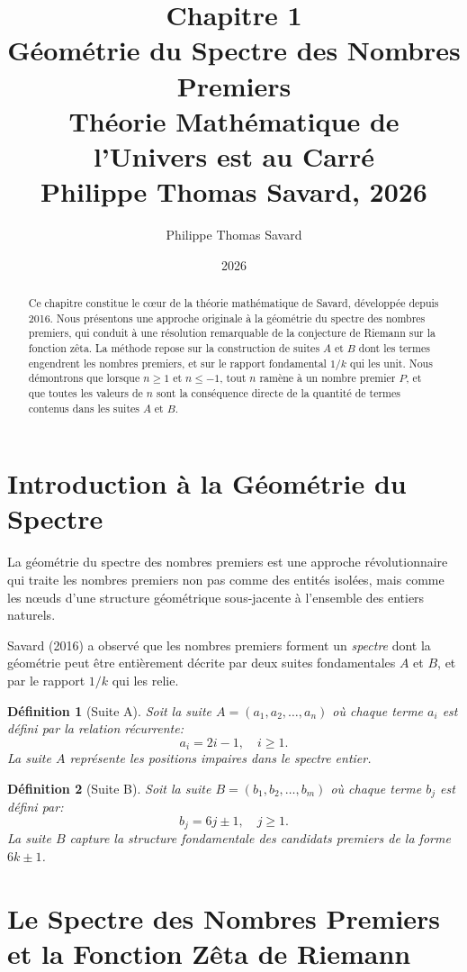 \documentclass[12pt,a4paper]{article}
\title{%
  \textbf{Chapitre 1}\\[0.5em]
  \Large Géométrie du Spectre des Nombres Premiers\\[0.5em]
  \large Théorie Mathématique de l'Univers est au Carré\\[0.5em]
  \normalsize Philippe Thomas Savard, 2026
}
\author{Philippe Thomas Savard}
\date{2026}
\newtheorem{definition}{Définition}
\begin{document}
\maketitle
\tableofcontents
\newpage

\begin{abstract}
Ce chapitre constitue le cœur de la théorie mathématique de Savard, développée depuis 2016.
Nous présentons une approche originale à la géométrie du spectre des nombres premiers,
qui conduit à une résolution remarquable de la conjecture de Riemann sur la fonction
zêta. La méthode repose sur la construction de suites $A$ et $B$ dont les termes
engendrent les nombres premiers, et sur le rapport fondamental $1/k$ qui les unit.
Nous démontrons que lorsque $n \geq 1$ et $n \leq -1$, tout $n$ ramène à un nombre
premier $P$, et que toutes les valeurs de $n$ sont la conséquence directe de la
quantité de termes contenus dans les suites $A$ et $B$.
\end{abstract}

\section{Introduction à la Géométrie du Spectre}

La géométrie du spectre des nombres premiers est une approche révolutionnaire qui traite
les nombres premiers non pas comme des entités isolées, mais comme les nœuds d'une
structure géométrique sous-jacente à l'ensemble des entiers naturels.

Savard (2016) a observé que les nombres premiers forment un \emph{spectre} dont la
géométrie peut être entièrement décrite par deux suites fondamentales $A$ et $B$,
et par le rapport $1/k$ qui les relie.

\begin{definition}[Suite A]
Soit la suite $A = (a_1, a_2, \ldots, a_n)$ où chaque terme $a_i$ est défini par
la relation récurrente:
\[
  a_i = 2i - 1, \quad i \geq 1.
\]
La suite $A$ représente les positions impaires dans le spectre entier.
\end{definition}

\begin{definition}[Suite B]
Soit la suite $B = (b_1, b_2, \ldots, b_m)$ où chaque terme $b_j$ est défini par:
\[
  b_j = 6j \pm 1, \quad j \geq 1.
\]
La suite $B$ capture la structure fondamentale des candidats premiers de la forme $6k \pm 1$.
\end{definition}

\section{Le Spectre des Nombres Premiers et la Fonction Zêta de Riemann}
\end{document}
